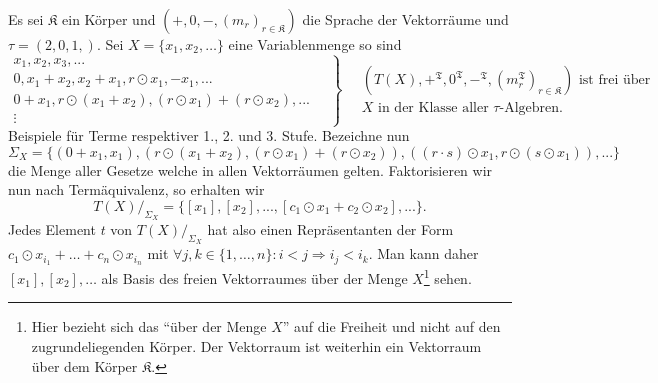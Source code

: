 \begin{example}
    Es sei $\mathfrak{K}$ ein Körper und $(+,0,-,(m_r)_{r\in\mathfrak{K}})$ die Sprache der Vektorräume und $\tau=(2,0,1,)$. Sei
    $X=\{x_1,x_2,\ldots\}$ eine Variablenmenge so sind
    $$ \left. \begin{matrix} x_1, x_2, x_3, ... \\ 0, x_1 + x_2, x_2 + x_1, r\odot x_1, -x_1, ... \\ 0 + x_1, r\odot (x_1+x_2), (r\odot x_1) + (r\odot x_2), ... \\ \vdots \end{matrix} \quad \right\} \quad \begin{matrix} (T(X), +^\mathfrak{T}, 0^\mathfrak{T}, -^\mathfrak{T},(m^\mathfrak{T}_r)_{r\in\mathfrak{K}}) \textrm{ ist frei über} \\ X \textrm{ in der Klasse aller $\tau$-Algebren.} \end{matrix} $$
    Beispiele für Terme respektiver 1., 2. und 3. Stufe. Bezeichne nun
    $$ \Sigma_X = \{ (0 + x_1, x_1), (r \odot (x_1+x_2), (r\odot x_1)+(r\odot x_2)), ((r\cdot s)\odot x_1, r\odot(s\odot x_1)), ... \} $$
    die Menge aller Gesetze welche in allen Vektorräumen gelten. Faktorisieren wir nun nach Term\-äquivalenz, so erhalten wir
    $$ T(X) /_{\Sigma_X} = \{ [x_1], [x_2], ..., [c_1\odot x_1 + c_2\odot x_2],... \}. $$
    Jedes Element $t$ von $T(X) /_{\Sigma_X}$ hat also einen Repräsentanten der Form $c_1\odot x_{i_1}+\ldots +c_n\odot x_{i_n}$ mit $\forall j,k\in\{1,\ldots,n\}:i<j\Rightarrow i_j<i_k$.
    Man kann daher $[x_1],[x_2],\ldots$ als Basis des freien Vektorraumes über der Menge $X$\footnote{Hier bezieht sich das ``über der Menge $X$'' auf die Freiheit und nicht auf den zugrundeliegenden Körper. Der Vektorraum ist weiterhin ein Vektorraum über dem Körper $\mathfrak{K}$.} sehen.
\end{example}
